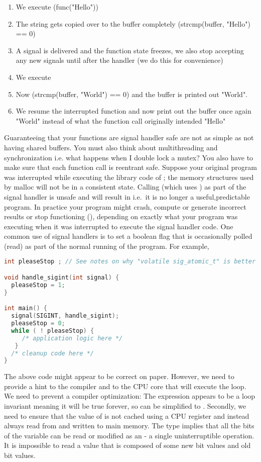 \begin{enumerate}
\item We execute \keyword(func("Hello"))
\item The string gets copied over to the buffer completely (strcmp(buffer, "Hello") == 0)
\item A signal is delivered and the function state freezes, we also stop accepting any new signals until after the handler (we do this for convenience)
\item We execute 
\item Now (strcmp(buffer, "World") == 0) and the buffer is printed out "World".
\item We resume the interrupted function and now print out the buffer once again "World" instead of what the function call originally intended "Hello"
\end{enumerate}

Guaranteeing that your functions are signal handler safe are not as simple as not having shared buffers. You must also think about multithreading and synchronization i.e. what happens when I double lock a mutex? You also have to make sure that each function call is reentrant safe. Suppose your original program was interrupted while executing the library code of  ; the memory structures used by malloc will not be in a consistent state. Calling  (which uses ) as part of the signal handler is unsafe and will result in  i.e.~it is no longer a useful,predictable program. In practice your program might crash, compute or generate incorrect results or stop functioning (), depending on exactly what your program was executing when it was interrupted to execute the signal handler code. One common use of signal handlers is to set a boolean flag that is occasionally polled (read) as part of the normal running of the program. For example,

\begin{lstlisting}[language=C]
int pleaseStop ; // See notes on why "volatile sig_atomic_t" is better

void handle_sigint(int signal) {
  pleaseStop = 1;
}

int main() {
  signal(SIGINT, handle_sigint);
  pleaseStop = 0;
  while ( ! pleaseStop) {
     /* application logic here */
   }
  /* cleanup code here */
}
\end{lstlisting}

The above code might appear to be correct on paper. However, we need to provide a hint to the compiler and to the CPU core that will execute the  loop. We need to prevent a compiler optimization: The expression  appears to be a loop invariant meaning it will be true forever, so can be simplified to . Secondly, we need to ensure that the value of  is not cached using a CPU register and instead always read from and written to main memory. The  type implies that all the bits of the variable can be read or modified as an  - a single uninterruptible operation. It is impossible to read a value that is composed of some new bit values and old bit values.

